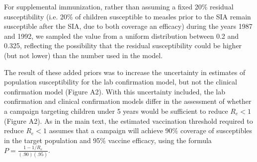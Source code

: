 For supplemental immunization, rather than assuming a fixed 20\% residual susceptibility (i.e. 20\% of children susceptible to measles prior to the SIA remain susceptible after the SIA, due to both coverage an efficacy) during the years 1987 and 1992, we sampled the value from a uniform distribution between 0.2 and 0.325, reflecting the possibility that the residual susceptibility could be higher (but not lower) than the number used in the model.  

The result of these added priors was to increase the uncertainty in estimates of population susceptibility for the lab confirmation model, but not the clinical confirmation model (Figure A2). With this uncertainty included, the lab confirmation and clinical confirmation models differ in the assessment of whether a campaign targeting children under 5 years would be sufficient to reduce $R_e < 1$ (Figure A2). As in the main text, the estimated vaccination threshold required to reduce $R_e < 1$ assumes that a campaign will achieve 90\% coverage of susceptibles in the target population and 95\% vaccine efficacy, using the formula $P = \frac{1-1/R_e}{(.90)(.95)}$. 